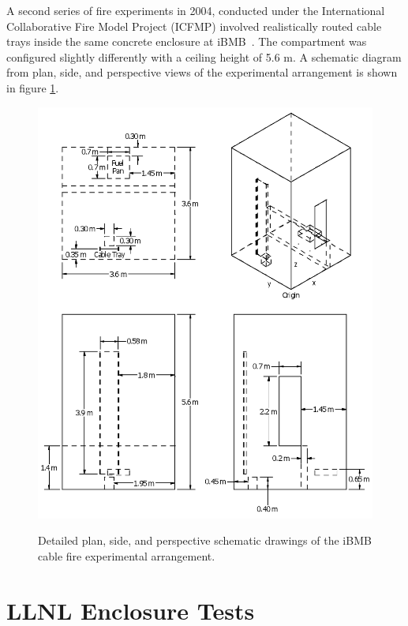 A second series of fire experiments in 2004, conducted under the International Collaborative Fire Model Project (ICFMP) involved realistically routed cable trays inside the same concrete enclosure at iBMB~\cite{Riese:2004}. The compartment was configured slightly differently with a ceiling height of 5.6 m. A schematic diagram from plan, side, and perspective views of the experimental arrangement is shown in figure \ref{fig:iBMB_Cable_Detailed}.

\begin{figure}[p]
\begin{center}
\includegraphics[width=6.5in]{FIGURES/iBMB/iBMB_Cable}\\
\end{center}
\caption{Detailed plan, side, and perspective schematic drawings of the iBMB cable fire experimental arrangement.}
 \label{fig:iBMB_Cable_Detailed}
\end{figure}

\clearpage

\section{LLNL Enclosure Tests}

